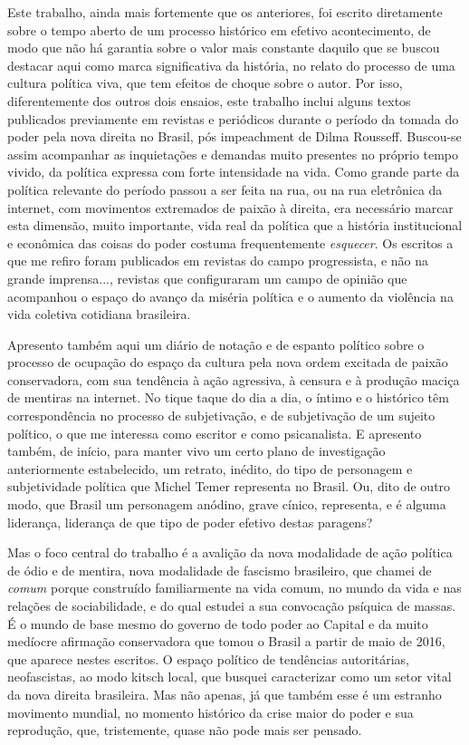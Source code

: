 Este trabalho, ainda mais fortemente que os anteriores, foi escrito
diretamente sobre o tempo aberto de um processo histórico em efetivo
acontecimento, de modo que não há garantia sobre o valor mais constante
daquilo que se buscou destacar aqui como marca significativa da
história, no relato do processo de uma cultura política viva, que tem
efeitos de choque sobre o autor. Por isso, diferentemente dos outros
dois ensaios, este trabalho inclui alguns textos publicados previamente
em revistas e periódicos durante o período da tomada do poder pela nova
direita no Brasil, pós impeachment de Dilma Rousseff. Buscou-se assim
acompanhar as inquietações e demandas muito presentes no próprio tempo
vivido, da política expressa com forte intensidade na vida. Como grande
parte da política relevante do período passou a ser feita na rua, ou na
rua eletrônica da internet, com movimentos extremados de paixão à
direita, era necessário marcar esta dimensão, muito importante, vida
real da política que a história institucional e econômica das coisas do
poder costuma frequentemente \emph{esquecer}. Os escritos a que me
refiro foram publicados em revistas do campo progressista, e não na
grande imprensa..., revistas que configuraram um campo de opinião que
acompanhou o espaço do avanço da miséria política e o aumento da
violência na vida coletiva cotidiana brasileira.

Apresento também aqui um diário de notação e de espanto político sobre o
processo de ocupação do espaço da cultura pela nova ordem excitada de
paixão conservadora, com sua tendência à ação agressiva, à censura e à
produção maciça de mentiras na internet. No tique taque do dia a dia, o
íntimo e o histórico têm correspondência no processo de subjetivação, e
de subjetivação de um sujeito político, o que me interessa como escritor
e como psicanalista. E apresento também, de início, para manter vivo um
certo plano de investigação anteriormente estabelecido, um retrato,
inédito, do tipo de personagem e subjetividade política que Michel Temer
representa no Brasil. Ou, dito de outro modo, que Brasil um personagem
anódino, grave cínico, representa, e é alguma liderança, liderança de
que tipo de poder efetivo destas paragens?

Mas o foco central do trabalho é a avalição da nova modalidade de ação
política de ódio e de mentira, nova modalidade de fascismo brasileiro,
que chamei de \emph{comum} porque construído familiarmente na vida
comum, no mundo da vida e nas relações de sociabilidade, e do qual
estudei a sua convocação psíquica de massas. É o mundo de base mesmo do
governo de todo poder ao Capital e da muito medíocre afirmação
conservadora que tomou o Brasil a partir de maio de 2016, que aparece
nestes escritos. O espaço político de tendências autoritárias,
neofascistas, ao modo kitsch local, que busquei caracterizar como um
setor vital da nova direita brasileira. Mas não apenas, já que também
esse é um estranho movimento mundial, no momento histórico da crise
maior do poder e sua reprodução, que, tristemente, quase não pode mais
ser pensado.

